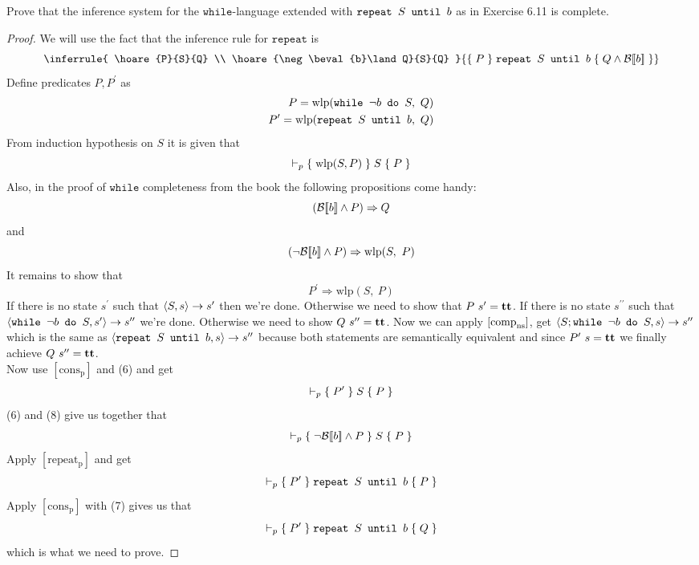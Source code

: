 Prove that the inference system for the $\mathtt{while}$-language extended with
$\texttt{repeat } S \texttt{ until } b$ as in Exercise 6.11 is complete.
\begin{proof}
We will use the fact that the inference rule for $\mathtt{repeat}$ is
\begin{equation*}
[\mathrm{repeat_p}]\\ \\
\inferrule
{
	\hoare{P}{S}{Q} \\ \hoare{\neg\beval{b}\land Q}{S}{Q}
}
{
	\hoare{P}{\srepeat{S}{b}}{Q\land\beval{b}}
}
\end{equation*}
Define predicates $P, P^\prime$ as
\begin{align*}
P=\mathrm{wlp}(\texttt{while } \neg b \texttt{ do } S,\ Q)\\
P^\prime=\mathrm{wlp}(\texttt{repeat } S \texttt{ until } b,\ Q)
\end{align*}
From induction hypothesis on $S$ it is given that
\begin{equation}
\vdash_p{\{\;\mathrm{wlp}(S,P)\;\}\;S\;\{\;P\;\}}
\end{equation}
Also, in the proof of $\mathtt{while}$ completeness from the book the following propositions come handy:
\begin{equation}
(\mathcal{B}[\![b]\!] \land P)\Rightarrow Q
\end{equation}
and
\begin{equation}
(\neg\mathcal{B}[\![b]\!] \land P)\Rightarrow \mathrm{wlp}(S,\ P)
\end{equation}
It remains to show that
\begin{equation*}
P^\prime\Rightarrow \mathrm{wlp}(S,\ P)
\end{equation*}
If there is no state $s^\prime$ such that $\left<S,s\right> \rightarrow s^\prime$ then we're done. Otherwise we need to show that $P\ s^\prime =\textbf{tt}$. If there is no state $s^{\prime\prime}$ such that $\left<\texttt{while } \neg b \texttt{ do } S,s^\prime\right> \rightarrow s^{\prime\prime}$ we're done. Otherwise we need to show $Q\ s^{\prime\prime} =\textbf{tt}$.
Now we can apply $\left[\text{comp}_{\text{ns}}^{\text{}}\right]$, get $\left<S;\texttt{while } \neg b \texttt{ do } S,s\right> \rightarrow s^{\prime\prime}$ which is the same as $\left<\texttt{repeat } S \texttt{ until } b,s\right> \rightarrow s^{\prime\prime}$ because both statements are semantically equivalent and since $P^\prime\ s=\textbf{tt}$ we finally achieve $Q\ s^{\prime\prime} =\textbf{tt}$.\\

Now use $[\mathrm{cons_p}]$ and (6) and get
\begin{equation*}
\vdash_p{\{\;P^\prime\;\}\;S\;\{\;P\;\}}
\end{equation*}
(6) and (8) give us together that
\begin{equation*}
\vdash_p{\{\;\neg\mathcal{B}[\![b]\!] \land P\;\}\;S\;\{\;P\;\}}
\end{equation*}
Apply $[\mathrm{repeat_p}]$ and get
\begin{equation*}
\vdash_p{\{\;P^\prime\;\}\;\texttt{repeat } S \texttt{ until } b\;\{\;P\;\}}
\end{equation*}
Apply $[\mathrm{cons_p}]$ with (7) gives us that
\begin{equation*}
\vdash_p{\{\;P^\prime\;\}\;\texttt{repeat } S \texttt{ until } b\;\{\;Q\;\}}
\end{equation*}
which is what we need to prove.
\end{proof}
